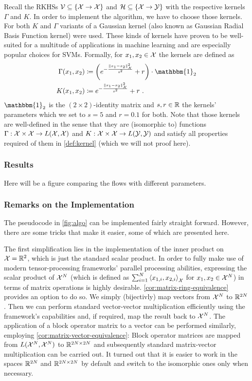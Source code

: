 Recall the RKHSs $\mathcal{V} \subseteq \{\mathcal{X} \rightarrow \mathcal{X}\}$ and $\mathcal{H} \subseteq \{\mathcal{X} \rightarrow \mathcal{Y}\}$ with the respective kernels $\Gamma$ and $K$.
In order to implement the algorithm, we have to choose those kernels.
For both $K$ and $\Gamma$ variants of a Gaussian kernel (also known as Gaussian Radial Basis Function kernel) were used.
These kinds of kernels have proven to be well-suited for a multitude of applications in machine learning and are especially popular choices for SVMs. 
Formally, for $x_1, x_2 \in \mathcal{X}$ the kernels are defined as
\begin{align}
	\Gamma(x_1, x_2) &\coloneqq \left(e^{-\frac{\norm{x_1 - x_2}_\cX^2}{s^2}} + r\right) \cdot \mathbbm{1}_2\\
	K(x_1, x_2) &\coloneqq e^{-\frac{\norm{x_1 - x_2}_\cX^2}{s^2}} + r \ .
\end{align}
$\mathbbm{1}_2$ is the $(2\times2)$-identity matrix and $s, r \in \mathbb{R}$ the kernels' parameters which we set to $s = 5$ and $r = 0.1$ for both.
Note that those kernels are well-defined in the sense that they are (isomorphic to) functions $\Gamma: \mathcal{X} \times \mathcal{X} \rightarrow L(\mathcal{X}, \mathcal{X})$ and $K: \mathcal{X} \times \mathcal{X} \rightarrow L(\mathcal{Y}, \mathcal{Y})$ and satisfy all properties required of them in \cref{def:kernel} (which we will not proof here).


\subsubsection{Results}

Here will be a figure comparing the flows with different parameters.

\subsubsection{Remarks on the Implementation}

The pseudocode in \cref{fig:algo} can be implemented fairly straight forward.
However, there are some tricks that make it easier, some of which are presented here.

The first simplification lies in the implementation of the inner product on $\mathcal{X} = \mathbb{R}^2$, which is just the standard scalar product.
In order to fully make use of modern tensor-processing frameworks' parallel processing abilities, expressing the scalar product of $\mathcal{X}^N$ (which is defined as $\sum_{i=1}^N \left<x_{1, i}, x_{2, i}\right>_{\mathcal{X}}$ for $x_1, x_2 \in \mathcal{X}^N$) in terms of matrix operations is highly desirable.
\cref{cor:matrix-ring-equivalence} provides an option to do so.
We simply (bijectivly) map vectors from $\mathcal{X}^N$ to $\mathbb{R}^{2N}$.
Then we can perform standard vector-vector multiplication efficiently using the framework's capabilities and, if required, map the result back to $\mathcal{X}^N$.
The application of a block operator matrix to a vector can be performed similarly, employing \cref{cor:matrix-vector-equivalence}:
Block operator matrices are mapped from $L(\mathcal{X}^N, \mathcal{X}^N)$ to $\mathbb{R}^{2N \times 2N}$ and subsequently standard matrix-vector multiplication can be carried out.
It turned out that it is easier to work in the spaces $\mathbb{R}^{2N}$ and $\mathbb{R}^{2N \times 2N}$ by default and switch to the isomorphic ones only when necessary.

